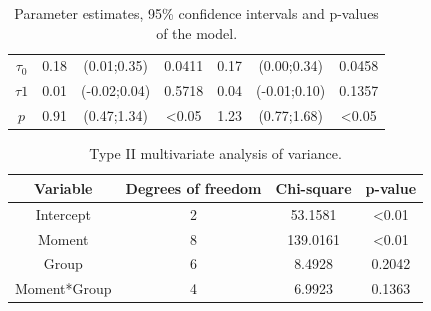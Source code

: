 \documentclass[AMA,STIX1COL]{WileyNJD-v2}
\begin{document}
\begin{table}[H]
\begin{tabular}{c|cccccc}
$\tau_0$                   & 0.18       & (0.01;0.35)                                                       & \multicolumn{1}{c|}{0.0411} & 0.17       & (0.00;0.34)                                                       & 0.0458           \\
$\tau1$                    & 0.01       & (-0.02;0.04)                                                      & \multicolumn{1}{c|}{0.5718}           & 0.04       & (-0.01;0.10)                                                      & 0.1357           \\
$p$                        & 0.91       & (0.47;1.34)                                                       & \multicolumn{1}{c|}{\textless 0.05} & 1.23       & (0.77;1.68)                                                       & \textless 0.05 \\ \hline
\end{tabular}
\caption{Parameter estimates, 95\% confidence intervals and p-values of the model.}
\label{tab3}
\end{table}


\begin{table}[H]
\centering
\begin{tabular}{cccc}
\hline
Variable      & Degrees of freedom & Chi-square   & p-value        \\ \hline
Intercept     & 2                  & 53.1581      & \textless 0.01 \\
Moment        & 8                  & 139.0161     & \textless 0.01 \\
Group         & 6                  & 8.4928       & 0.2042         \\
Moment*Group  & 4                  & 6.9923       & 0.1363         \\ \hline
\end{tabular}
\caption{Type II multivariate analysis of variance.}
\label{tab4}
\end{table}

\end{document}
